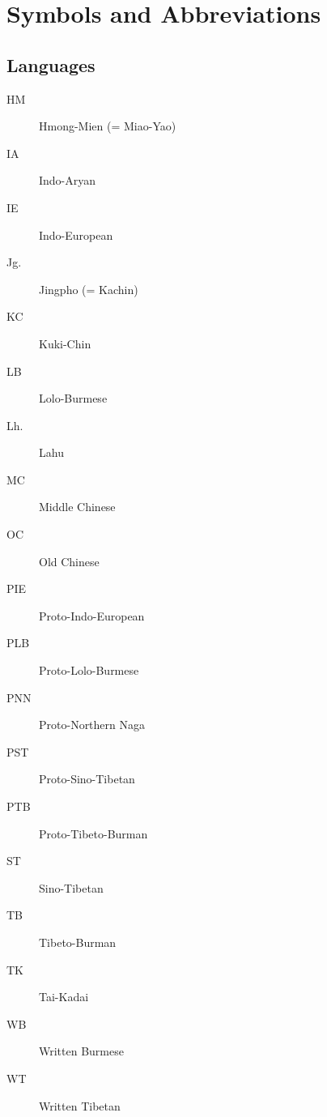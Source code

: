 \vspace{0.25em}

\renewcommand{\thefootnote}{\arabic{footnote}}
\setcounter{footnote}{0}

\chapter*{Symbols and Abbreviations}

\renewcommand\thefootnote{*}

\section*{Languages}
\begin{multicols}{2}
\begin{description}
\item[HM]	Hmong-Mien (= Miao-Yao)
\item[IA]	Indo-Aryan
\item[IE]	Indo-European
\item[Jg.]	Jingpho (= Kachin)
\item[KC]	Kuki-Chin
\item[LB]	Lolo-Burmese
\item[Lh.]	Lahu
\item[MC]	Middle Chinese
\item[OC]	Old Chinese
\item[PIE]	Proto-Indo-European
\item[PLB]	Proto-Lolo-Burmese
\item[PNN]	Proto-Northern Naga
\item[PST]	Proto-Sino-Tibetan
\item[PTB]	Proto-Tibeto-Burman
\item[ST]	Sino-Tibetan
\item[TB]	Tibeto-Burman
\item[TK]	Tai-Kadai
\item[WB]	Written Burmese
\item[WT]	Written Tibetan
\end{description}
\end{multicols}

